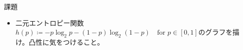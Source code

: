 \documentclass[lualatex,handout]{beamer}
\newcommand\KL[2]{D\left(#1\,\|\,#2\right)}
\theoremstyle{definition}
\begin{document}
\begin{frame}{課題}
\begin{itemize}
\item 二元エントロピー関数$h(p)\coloneq -p\log_2 p - (1-p)\log_2(1-p)\quad\text{for } p\in[0,1]$のグラフを描け。凸性に気をつけること。
\end{itemize}
\end{frame}
\end{document}
